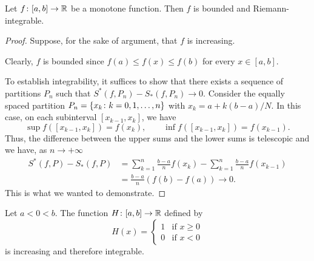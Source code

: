   \begin{theorem}
  \label{th:integrabilita_monotone}%
  Let $f\colon [a,b]\to {\mathbb R}$ be a monotone function. Then $f$ is bounded and
  Riemann-integrable.
  \end{theorem}
  \begin{proof}
  Suppose, for the sake of argument, that $f$ is increasing.
  
  Clearly, $f$ is bounded since $f(a) \le f(x) \le f(b)$ for every
  $x\in [a,b]$.
  
  To establish integrability, it suffices to show
  that there exists a sequence of partitions $P_n$
  such that $S^*(f,P_n) - S_*(f,P_n) \to 0$.
  Consider the equally spaced partition
  $P_n={\left\{ x_k \colon k=0,1, \dots, n \right\}}$ with $x_k=a+k(b-a)/N$.
  In this case, on each subinterval $[x_{k-1},x_k]$, we have
  \[
    \sup f([x_{k-1}, x_k]) = f(x_k),
    \qquad
    \inf f([x_{k-1}, x_k]) = f(x_{k-1}).
  \]
  Thus, the difference between the upper sums
  and the lower sums is telescopic
  and we have, as $n\to +\infty$
  \begin{align*}
  S^*(f,P) - S_*(f,P)
  &= \sum_{k=1}^n \frac{b-a}{n} f(x_k)
    - \sum_{k=1}^n \frac{b-a}{n} f(x_{k-1}) \\
  &= \frac{b-a}{n}(f(b)-f(a)) \to 0.
  \end{align*}
  This is what we wanted to demonstrate.
  \end{proof}
  
  \begin{example}
  \label{ex:heaviside}
  Let $a<0<b$.
  The function $H\colon [a,b] \to {\mathbb R}$ defined by
  \[
  H(x) =
  \begin{cases}
  1 & \text{if $x\ge 0$}\\
  0 & \text{if $x< 0$}
  \end{cases}
  \]
  is increasing and therefore integrable.
  \end{example}
  
